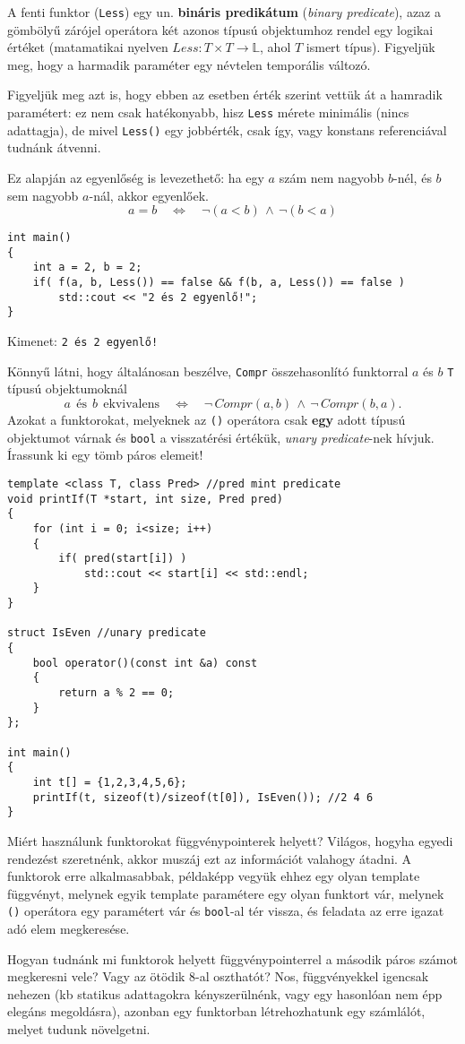 \documentclass[a4paper,11.5pt,table]{article}
\begin{document}
	A fenti funktor (\texttt{Less}) egy un. \textbf{bináris predikátum} (\textit{binary predicate}), azaz a gömbölyű zárójel operátora két azonos típusú objektumhoz rendel egy logikai értéket (matamatikai nyelven $Less: T\times T \to \mathbb{L}$, ahol $T$ ismert típus). Figyeljük meg, hogy a harmadik paraméter egy névtelen temporális változó. 
	
	\begin{note}
		Figyeljük meg azt is, hogy ebben az esetben érték szerint vettük át a hamradik paramétert: ez nem csak hatékonyabb, hisz \texttt{Less} mérete minimális (nincs adattagja), de mivel \texttt{Less()} egy jobbérték, csak így, vagy konstans referenciával tudnánk átvenni.
	\end{note}
	
	Ez alapján az egyenlőség is levezethető: ha egy $a$ szám nem nagyobb $b$-nél, és $b$ sem nagyobb $a$-nál, akkor egyenlőek. 
	\[a = b \quad \Leftrightarrow \quad \neg(a<b)\, \wedge\, \neg(b<a)\]
	\begin{lstlisting}
int main()
{
	int a = 2, b = 2;
	if( f(a, b, Less()) == false && f(b, a, Less()) == false )
		std::cout << "2 és 2 egyenlő!";
}
	\end{lstlisting}
	Kimenet: \texttt{2 és 2 egyenlő!}
	\smallskip
	
	Könnyű látni, hogy általánosan beszélve, \texttt{Compr} összehasonlító funktorral $a$ és $b$ \texttt{T} típusú objektumoknál
	\[ a\ \ \text{és}\ \ b\ \ \text{ekvivalens}\quad \Leftrightarrow\quad \neg \,Compr(a, b)\, \wedge\, \neg \,Compr(b, a). \]
	Azokat a funktorokat, melyeknek az \texttt{()} operátora csak \textbf{egy} adott típusú objektumot várnak és \texttt{bool} a visszatérési értékük, \textit{unary predicate}-nek hívjuk. Írassunk ki egy tömb páros elemeit!
	\begin{lstlisting}
template <class T, class Pred> //pred mint predicate
void printIf(T *start, int size, Pred pred)
{
	for (int i = 0; i<size; i++)
	{
		if( pred(start[i]) )
			std::cout << start[i] << std::endl;
	}
}

struct IsEven //unary predicate
{
	bool operator()(const int &a) const
	{
		return a % 2 == 0;
	}
};

int main()
{
	int t[] = {1,2,3,4,5,6};
	printIf(t, sizeof(t)/sizeof(t[0]), IsEven()); //2 4 6
}
	\end{lstlisting}
	\begin{note}
		Miért használunk funktorokat függvénypointerek helyett? Világos, hogyha egyedi rendezést szeretnénk, akkor muszáj ezt az információt valahogy átadni. A funktorok erre alkalmasabbak, példaképp vegyük ehhez egy olyan template függvényt, melynek egyik template paramétere egy olyan funktort vár, melynek \texttt{()} operátora egy paramétert vár és \texttt{bool}-al tér vissza, és feladata az erre igazat adó elem megkeresése. 
		
		Hogyan tudnánk mi funktorok helyett függvénypointerrel a második páros számot megkeresni vele? Vagy az ötödik 8-al oszthatót? Nos, függvényekkel igencsak nehezen (kb statikus adattagokra kényszerülnénk, vagy egy hasonlóan nem épp elegáns megoldásra), azonban egy funktorban létrehozhatunk egy számlálót, melyet tudunk növelgetni.
	\end{note}
\end{document}
